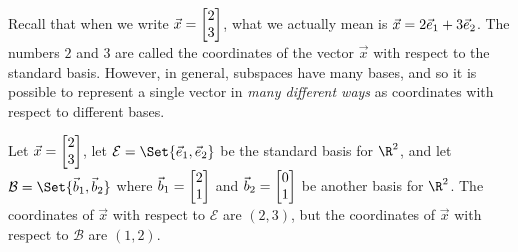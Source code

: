 
Recall that when we write $\vec x=\mat{2\\3}$, what we actually mean is $\vec x=2{\vec e_1}+3{\vec e_2}$. The numbers $2$
and $3$ are called the coordinates of the vector $\vec x$ with respect to the standard basis.  However, in general,
subspaces have many bases, and so it is possible to represent a single vector in \emph{many different ways}
as coordinates with respect to different bases.

\medskip
Let $\vec x=\mat{2\\3}$, let $\mathcal E=\Set{\xhat,\yhat}$ be the standard basis for $\R^2$, and let
$\mathcal B=\Set{\vec b_1,\vec b_2}$ where $\vec b_1=\mat{2\\1}$ and $\vec b_2=\mat{0\\1}$ be another
basis for $\R^2$. The coordinates of $\vec x$ with respect to $\mathcal E$ are $(2,3)$, but
the coordinates of $\vec x$ with respect to $\mathcal B$ are $(1,2)$.


